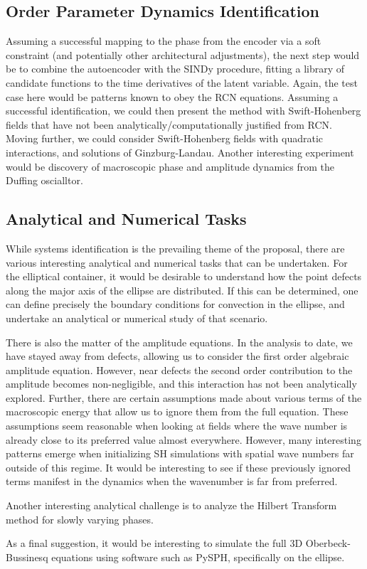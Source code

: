 \documentclass[12pt]{article}
\numberwithin{equation}{section}
\begin{document}
\subsection{Order Parameter Dynamics Identification}
\par Assuming a successful mapping to the phase from the encoder via a soft constraint (and potentially other architectural adjustments), the next step would be to combine the autoencoder with the SINDy procedure, fitting a library of candidate functions to the time derivatives of the latent variable. Again, the test case here would be patterns known to obey the RCN equations. Assuming a successful identification, we could then present the method with Swift-Hohenberg fields that have not been analytically/computationally justified from RCN. Moving further, we could consider Swift-Hohenberg fields with quadratic interactions, and solutions of Ginzburg-Landau.
Another interesting experiment would be discovery of macroscopic phase and amplitude dynamics from the Duffing oscialltor.

\subsection{Analytical and Numerical Tasks}
\par While systems identification is the prevailing theme of the proposal, there are various interesting analytical and numerical tasks that can be undertaken.
For the elliptical container, it would be desirable to understand how the point defects along the major axis of the ellipse are distributed. If this can be determined, one can define precisely the boundary conditions for convection in the ellipse, and undertake an analytical or numerical study of that scenario.
\par There is also the matter of the amplitude equations. In the analysis to date, we have stayed away from defects, allowing us to consider the first order algebraic amplitude equation. However, near defects the second order contribution to the amplitude becomes non-negligible, and this interaction has not been analytically explored.
Further, there are certain assumptions made about various terms of the macroscopic energy that allow us to ignore them from the full equation. These assumptions seem reasonable when looking at fields where the wave number is already close to its preferred value almost everywhere. However, many interesting patterns emerge when initializing SH simulations with spatial wave numbers far outside of this regime. It would be interesting to see if these previously ignored terms manifest in the dynamics when the wavenumber is far from preferred.
\par Another interesting analytical challenge is to analyze the Hilbert Transform method for slowly varying phases.
\par As a final suggestion, it would be interesting to simulate the full 3D Oberbeck-Bussinesq equations using software such as PySPH, specifically on the ellipse.
\end{document}
